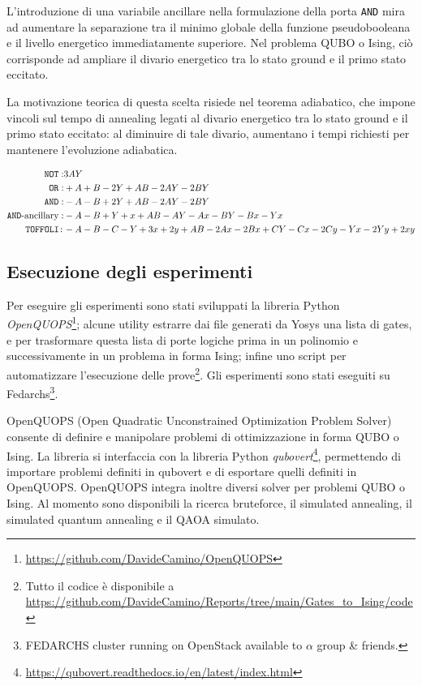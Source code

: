 \documentclass[]{article}
\begin{document}
L'introduzione di una variabile ancillare nella formulazione della porta \texttt{AND} mira ad aumentare la separazione tra il minimo globale della funzione pseudobooleana e il livello energetico immediatamente superiore. Nel problema QUBO o Ising, ciò corrisponde ad ampliare il divario energetico tra lo stato ground e il primo stato eccitato. 

La motivazione teorica di questa scelta risiede nel teorema adiabatico, che impone vincoli sul tempo di annealing legati al divario energetico tra lo stato ground e il primo stato eccitato: al diminuire di tale divario, aumentano i tempi richiesti per mantenere l'evoluzione adiabatica.

{
	\footnotesize
	\begin{align}
		\texttt{NOT}:&3 AY\\
		\texttt{OR}:&+A +B -2 Y +AB -2 AY -2 BY\\
		\texttt{AND}:&-A -B +2 Y +AB -2 AY -2 BY\label{eqn:and} \\
		\texttt{AND}\textnormal{-ancillary}:&-A -B + Y + x + AB- AY- Ax -BY-Bx -Yx\label{eqn:and_anc}\\
		\texttt{TOFFOLI:}& -A-B-C-Y+3 x + 2 y+AB-2Ax-2Bx+CY-Cx-2Cy-Yx-2Yy+2xy
	\end{align}
}

\subsection{Esecuzione degli esperimenti}
Per eseguire gli esperimenti sono stati sviluppati la libreria Python \emph{OpenQUOPS}\footnote{\url{https://github.com/DavideCamino/OpenQUOPS}}; alcune utility estrarre dai file generati da Yosys una lista di gates, e per trasformare questa lista di porte logiche prima in un polinomio e successivamente in un problema in forma Ising; infine uno script per automatizzare l'esecuzione delle prove\footnote{Tutto il codice è disponibile a \url{https://github.com/DavideCamino/Reports/tree/main/Gates_to_Ising/code}}. Gli esperimenti sono stati eseguiti su Fedarchs\footnote{FEDARCHS cluster running on OpenStack available to $\alpha$ group \& friends.}. 

OpenQUOPS (Open Quadratic Unconstrained Optimization Problem Solver) consente di definire e manipolare problemi di ottimizzazione in forma QUBO o Ising. La libreria si interfaccia con la libreria Python \emph{qubovert}\footnote{\url{https://qubovert.readthedocs.io/en/latest/index.html}}, permettendo di importare problemi definiti in qubovert e di esportare quelli definiti in OpenQUOPS. OpenQUOPS integra inoltre diversi solver per problemi QUBO o Ising. Al momento sono disponibili la ricerca bruteforce, il simulated annealing, il simulated quantum annealing e il QAOA simulato.
\end{document}
